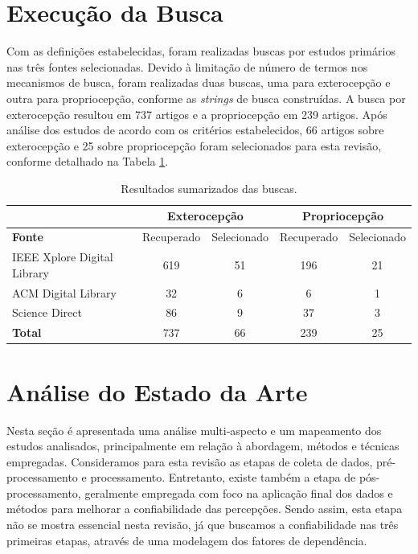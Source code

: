 \section{Execução da Busca}

Com as definições estabelecidas, foram realizadas buscas por estudos primários nas três fontes selecionadas. Devido à limitação de número de termos nos mecanismos de busca, foram realizadas duas buscas, uma para exterocepção e outra para propriocepção, conforme as \textit{strings} de busca construídas. A busca por exterocepção resultou em 737 artigos e a propriocepção em 239 artigos. Após análise dos estudos de acordo com os critérios estabelecidos, 66 artigos sobre exterocepção e 25 sobre propriocepção foram selecionados para esta revisão, conforme detalhado na Tabela \ref{tabela:resultados_sumarizados_busca}. 

\begin{table}[h]
    \caption{Resultados sumarizados das buscas.}
    \label{tabela:resultados_sumarizados_busca}
    \centering
    \small
    \begin{tabular}{lcccc}
    \cmidrule(l){2-5} & \multicolumn{2}{c}{\textbf{Exterocepção}} & \multicolumn{2}{c}{\textbf{Propriocepção}} \\ \midrule
    \textbf{Fonte} & Recuperado & Selecionado & Recuperado & Selecionado \\ \midrule
    IEEE Xplore Digital Library & 619 & 51 & 196 & 21 \\ \midrule
    ACM Digital Library & 32 & 6 & 6 & 1 \\ \midrule
    Science Direct & 86 & 9 & 37 & 3 \\ \midrule
    \textbf{Total} & 737 & 66 & 239 & 25 \\ \bottomrule
    \end{tabular}
\end{table}

\section{Análise do Estado da Arte}

Nesta seção é apresentada uma análise multi-aspecto e um mapeamento dos estudos analisados, principalmente em relação à abordagem, métodos e técnicas empregadas. Consideramos para esta revisão as etapas de coleta de dados, pré-processamento e processamento. Entretanto, existe também a etapa de pós-processamento, geralmente empregada com foco na aplicação final dos dados e métodos para melhorar a confiabilidade das percepções. Sendo assim, esta etapa não se mostra essencial nesta revisão, já que buscamos a confiabilidade nas três primeiras etapas, através de uma modelagem dos fatores de dependência. 

